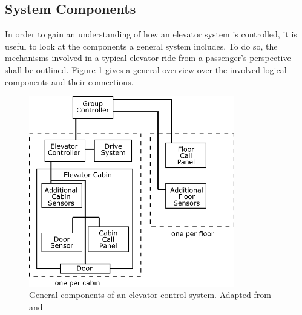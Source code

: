 \subsection{System Components}

In order to gain an understanding of how an elevator system is controlled,
it is useful to look at the components a general system includes.
To do so, the mechanisms involved in a typical elevator ride 
from a passenger's perspective shall be outlined.
Figure \ref{fig:sota:systemcomponents} gives a general overview over the involved logical components and their connections.

\begin{figure}[hbt]
	\centering
	\includegraphics[width=0.8\textwidth, keepaspectratio]{resources/systemcomponets}
	\caption[General components of an elevator control system]{\label{fig:sota:systemcomponents} General components of an elevator control system. Adapted from \textcite[][pp.~4,16]{xang2016trafficlist} and  \textcite[][p.~10]{siikonen1997models}}
\end{figure}

